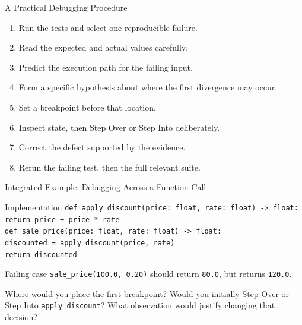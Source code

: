 \documentclass[aspectratio=169,10pt]{beamer}
\begin{document}

\begin{frame}{A Practical Debugging Procedure}
  \begin{enumerate}
    \item Run the tests and select one reproducible failure.
    \item Read the expected and actual values carefully.
    \item Predict the execution path for the failing input.
    \item Form a specific hypothesis about where the first divergence may occur.
    \item Set a breakpoint before that location.
    \item Inspect state, then Step Over or Step Into deliberately.
    \item Correct the defect supported by the evidence.
    \item Rerun the failing test, then the full relevant suite.
  \end{enumerate}
\end{frame}

\begin{frame}[shrink=6]{Integrated Example: Debugging Across a Function Call}
  \begin{block}{Implementation}
    \texttt{def apply\_discount(price: float, rate: float) -> float:}\\
    \hspace*{0.20in}\texttt{return price + price * rate}\\[0.05in]
    \texttt{def sale\_price(price: float, rate: float) -> float:}\\
    \hspace*{0.20in}\texttt{discounted = apply\_discount(price, rate)}\\
    \hspace*{0.20in}\texttt{return discounted}
  \end{block}

  \begin{block}{Failing case}
    \texttt{sale\_price(100.0, 0.20)} should return \texttt{80.0}, but returns \texttt{120.0}.
  \end{block}

  \begin{activity}
    Where would you place the first breakpoint? Would you initially Step Over or Step Into \texttt{apply\_discount}? What observation would justify changing that decision?
  \end{activity}
\end{frame}
\end{document}
